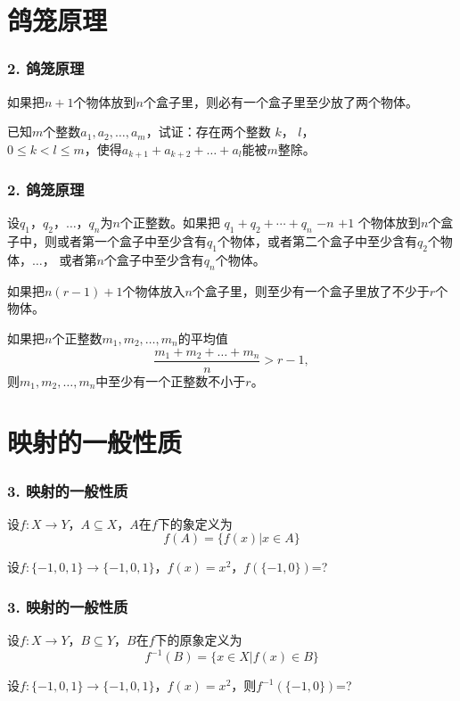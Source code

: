 \documentclass{beamer}
\begin{document}
\begin{CJK*}{UTF8}{gbsn}
\section{鸽笼原理}
\begin{frame}
  \frametitle{2. 鸽笼原理}
  \begin{Thm}[鸽笼原理]
    如果把$n+1$个物体放到$n$个盒子里，则必有一个盒子里至少放了两个物体。
  \end{Thm}
  \pause
  \begin{Ex}
    已知$m$个整数$a_1,a_2,\ldots,a_m$，试证：存在两个整数 $k$， $l$， \\ $0\leq k < l \leq m$，使得$a_{k+1}+a_{k+2}+\ldots+a_{l}$能被$m$整除。
  \end{Ex}
\end{frame}

\begin{frame}
  \frametitle{2. 鸽笼原理}
  \begin{Thm}[鸽笼原理的强形式]
    设$q_1$，$q_2$，$\ldots$，$q_n$为$n$个正整数。如果把 $q_1 + q_2 + \cdots + q_n$  $- n$ $ + 1$ 个物体放到$n$个盒子中，则或者第一个盒子中至少含有$q_1$个物体，或者第二个盒子中至少含有$q_2$个物体，$\ldots$，
    或者第$n$个盒子中至少含有$q_n$个物体。
  \end{Thm}\pause
  \begin{Cor}
    如果把$n(r-1) + 1$个物体放入$n$个盒子里，则至少有一个盒子里放了不少于$r$个物体。
  \end{Cor}\pause
  \begin{Cor}
    如果把$n$个正整数$m_1, m_2, \ldots, m_n$的平均值\[\frac{m_1 + m_2 + \ldots + m_n}{n} > r - 1,\] 则$m_1, m_2, \ldots, m_n$中至少有一个正整数不小于$r$。
  \end{Cor}
\end{frame}
\section{映射的一般性质}
\begin{frame}
  \frametitle{3. 映射的一般性质}
  \begin{Def}
    设$f:X\to Y$，$A \subseteq X$，$A$在$f$下的\alert{象}定义为\[f(A)=\{f(x)|x\in A\}\]
  \end{Def}\pause
  \begin{Ex}
    设$f:\{-1,0,1\}\to \{-1,0,1\}$，$f(x)=x^2$，$f(\{-1,0\})$=?
  \end{Ex}
\end{frame}
\begin{frame}
  \frametitle{3. 映射的一般性质}
  \begin{Def}
    设$f:X\to Y$，$B \subseteq Y$，$B$在$f$下的\alert{原象}定义为\[f^{-1}(B)=\{x\in X|f(x)\in B\}\]
  \end{Def}\pause
  \begin{Ex}
    设$f:\{-1,0,1\}\to \{-1,0,1\}$，$f(x)=x^2$，则$f^{-1}(\{-1,0\})$=?
  \end{Ex}
\end{frame}


\end{CJK*}
\end{document}
